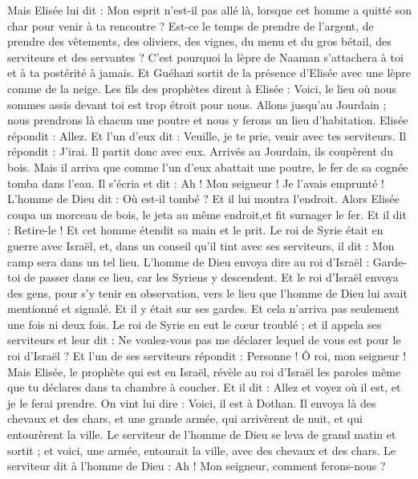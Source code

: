 \begin{multicols}{2}
Mais Elisée lui dit : Mon esprit n'est-il pas allé là, lorsque cet homme a quitté son char pour venir à ta rencontre ? Est-ce le temps de prendre de l'argent, de prendre des vêtements, des oliviers, des vignes, du menu et du gros bétail, des serviteurs et des servantes ?
C'est pourquoi la lèpre de Naaman s'attachera à toi et à ta postérité à jamais. Et Guéhazi sortit de la présence d'Elisée avec une lèpre comme de la neige.
\VerseOne{}Les fils des prophètes dirent à Elisée : Voici, le lieu où nous sommes assis devant toi est trop étroit pour nous.
Allons jusqu'au Jourdain ; nous prendrons là chacun une poutre et nous y ferons un lieu d'habitation. Elisée répondit : Allez.
Et l'un d'eux dit : Veuille, je te prie, venir avec tes serviteurs. Il répondit : J'irai.
Il partit donc avec eux. Arrivés au Jourdain, ils coupèrent du bois.
Mais il arriva que comme l'un d'eux abattait une poutre, le fer de sa cognée tomba dans l'eau. Il s'écria et dit : Ah ! Mon seigneur ! Je l'avais emprunté !
L'homme de Dieu dit : Où est-il tombé ? Et il lui montra l'endroit. Alors Elisée coupa un morceau de bois, le jeta au même endroit,et fit surnager le fer.
Et il dit : Retire-le ! Et cet homme étendit sa main et le prit.
Le roi de Syrie était en guerre avec Israël, et, dans un conseil qu'il tint avec ses serviteurs, il dit : Mon camp sera dans un tel lieu.
L'homme de Dieu envoya dire au roi d'Israël : Garde-toi de passer dans ce lieu, car les Syriens y descendent.
Et le roi d'Israël envoya des gens, pour s'y tenir en observation, vers le lieu que l'homme de Dieu lui avait mentionné et signalé. Et il y était sur ses gardes. Et cela n'arriva pas seulement une fois ni deux fois.
Le roi de Syrie en eut le cœur troublé ; et il appela ses serviteurs et leur dit : Ne voulez-vous pas me déclarer lequel de vous est pour le roi d'Israël ?
Et l'un de ses serviteurs répondit : Personne ! Ô roi, mon seigneur ! Mais Elisée, le prophète qui est en Israël, révèle au roi d'Israël les paroles même que tu déclares dans ta chambre à coucher.
Et il dit : Allez et voyez où il est, et je le ferai prendre. On vint lui dire : Voici, il est à Dothan.
Il envoya là des chevaux et des chars, et une grande armée, qui arrivèrent de nuit, et qui entourèrent la ville.
Le serviteur de l'homme de Dieu se leva de grand matin et sortit ; et voici, une armée, entourait la ville, avec des chevaux et des chars. Le serviteur dit à l'homme de Dieu : Ah ! Mon seigneur, comment ferons-nous ?

\end{multicols}
